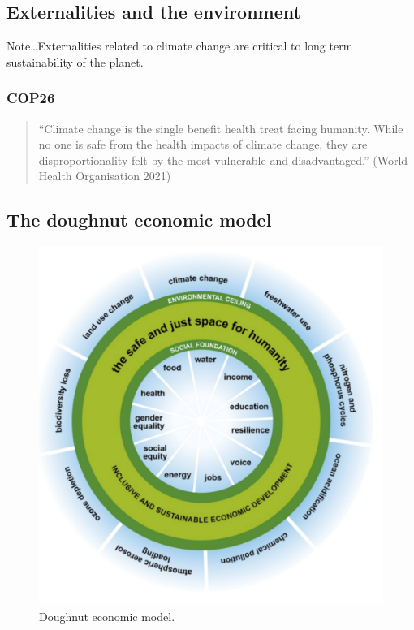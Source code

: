 \subsection{Externalities and the environment}
Note\dots Externalities related to climate change are critical to long term sustainability of the planet.
\subsubsection{COP26}
\begin{quote}
  ``Climate change is the single benefit health treat facing humanity. While no one is safe from the health impacts of climate change, they are disproportionality felt by the most vulnerable and disadvantaged.'' (World Health Organisation 2021)
\end{quote}
\subsection{The doughnut economic model}
\begin{figure}[H]
  \centering
  \includegraphics[width = \textwidth]{./img/figure20.png}
  \caption{Doughnut economic model.}
\end{figure}